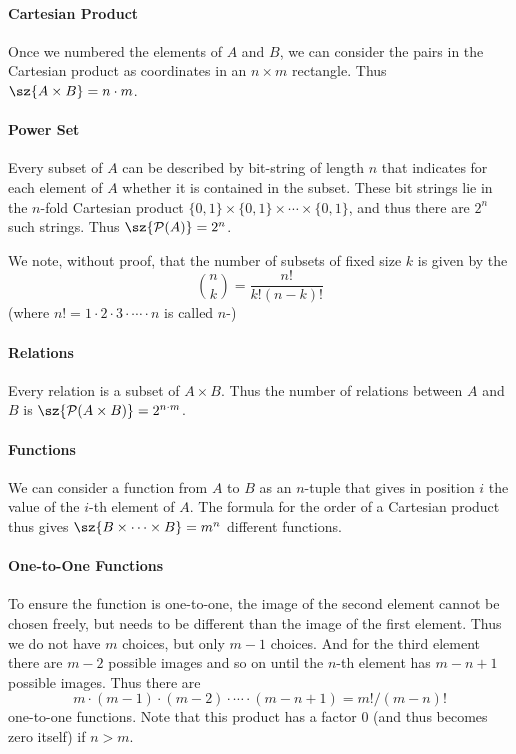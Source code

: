 \paragraph{Cartesian Product}
Once we numbered the elements of $A$ and $B$, we can consider the pairs in the Cartesian
product as coordinates in an $n\times m$ rectangle. Thus $\sz{A\times B}=n\cdot m$.

\paragraph{Power Set}
Every subset of $A$ can be described by bit-string of length $n$ that indicates for each
element of $A$ whether it is contained in the subset. These bit strings lie in the
$n$-fold Cartesian product $\{0,1\}\times\{0,1\}\times\cdots\times\{0,1\}$, and thus
there are $2^n$ such strings. Thus $\sz{{\cal P}(A)}=2^n$.

We note, without proof, that the number of subsets of fixed size $k$ is given by the
\[
{n\choose k}=\frac{n!}{k!(n-k)!}
\]
(where $n!=1\cdot 2\cdot 3\cdot\cdots\cdot n$ is called $n$-)

\paragraph{Relations}
Every relation is a subset of $A\times B$. Thus the number of relations between $A$ and
$B$ is $\sz{{\cal P}(A\times B)}=2^{n\cdot m}$.

\paragraph{Functions}
We can consider a function from $A$ to $B$ as an $n$-tuple that gives in position $i$
the value of the $i$-th element of $A$. The formula for the order of a Cartesian product
thus gives $\sz{B\times \cdots\times B}=m^n$ different functions.

\paragraph{One-to-One Functions}
To ensure the function is one-to-one, the image of the second element cannot be chosen
freely, but needs to be different than the image of the first element. Thus we do not
have $m$ choices, but only $m-1$ choices. And for the third element there are $m-2$
possible images and so on until the $n$-th element has $m-n+1$ possible images. Thus there are
\[
m\cdot (m-1)\cdot (m-2)\cdot \cdots\cdot (m-n+1)=m!/(m-n)!
\]
one-to-one functions. Note that this product has a factor $0$ (and thus becomes zero
itself) if $n>m$.

